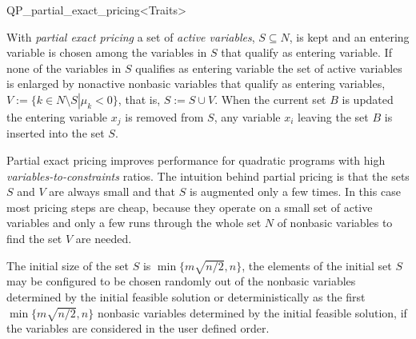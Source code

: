 
\begin{ccRefClass}{QP_partial_exact_pricing<Traits>}

\ccDefinition

With \emph{partial exact pricing} a set of \emph{active variables},
$S \subseteq N$, is kept and an entering variable is chosen among the
variables in $S$ that qualify as entering variable. If none of the variables
in $S$ qualifies as entering variable the set of active variables is enlarged by
nonactive nonbasic variables that qualify as entering variables,
$V:=\{k \in N \setminus S \left|\right. \mu_{k} < 0\}$, that is,
$S:=S \cup V$. When the current set $B$
is updated the entering variable $x_{j}$ is removed from $S$, any variable
$x_{i}$ leaving the set $B$ is inserted into the set $S$.

Partial exact pricing improves performance for quadratic programs
with high \emph{variables-to-constraints} ratios.
The intuition behind partial pricing is that the sets $S$ and $V$ are always
small and that $S$ is augmented only a few times. In this case most pricing
steps are cheap, because they operate on a small set of active variables and
only a few runs through the whole set $N$ of nonbasic variables to find the set
$V$ are needed.

The initial size of the set $S$ is $\min\{m\sqrt{n/2}, n\}$, the elements of
the initial set $S$ may be configured to be chosen randomly out of the nonbasic
variables determined by the initial feasible solution or
deterministically as the first $\min\{m\sqrt{n/2}, n\}$ nonbasic
variables determined by the initial feasible solution, if the variables are
considered in the user defined order.   
   

\end{ccRefClass}
